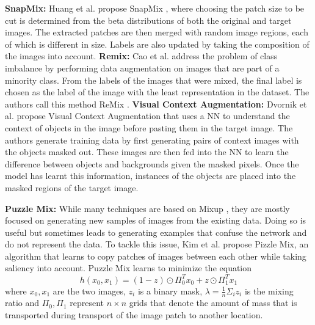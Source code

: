 \textbf{SnapMix: }
Huang et al. propose SnapMix \cite{huangSnapMixSemanticallyProportional2021}, where choosing the patch size to be cut is determined from the beta distributions of both the original and target images. The extracted patches are then merged with random image regions, each of which is different in size. Labels are also updated by taking the composition of the images into account.
\textbf{Remix: }
Cao et al. address the problem of class imbalance by performing data augmentation on images that are part of a minority class. From the labels of the images that were mixed, the final label is chosen as the label of the image with the least representation in the dataset. The authors call this method ReMix \cite{caoReMixImagetoImageTranslation2021}.
\textbf{Visual Context Augmentation: }
Dvornik et al. propose Visual Context Augmentation \cite{dvornikModelingVisualContext2018} that uses a NN to understand the context of objects in the image before pasting them in the target image. The authors generate training data by first generating pairs of context images with the objects masked out. These images are then fed into the NN to learn the difference between objects and backgrounds given the masked pixels. Once the model has learnt this information, instances of the objects are placed into the masked regions of the target image.

\textbf{Puzzle Mix: }
While many techniques are based on Mixup \cite{zhangMixupEmpiricalRisk2018}, they are mostly focused on generating new samples of images from the existing data. Doing so is useful but sometimes leads to generating examples that confuse the network and do not represent the data. To tackle this issue, Kim et al. \cite{kimPuzzleMixExploiting2020} propose Pizzle Mix, an algorithm that learns to copy patches of images between each other while taking saliency into account. Puzzle Mix learns to minimize the equation $$h(x_{0}, x_{1}) = (1-z) \odot \Pi_{0}^{T}x_{0} + z \odot \Pi_{1}^{T}x_{1}$$ where $x_{0}, x_{1}$ are the two images, $z_{i}$ is a binary mask, $\lambda = \frac{1}{n}\Sigma_{i}z_{i}$ is the mixing ratio and $\Pi_{0}, \Pi_{1}$ represent $n \times n$ grids that denote the amount of mass that is transported during transport of the image patch to another location. 

